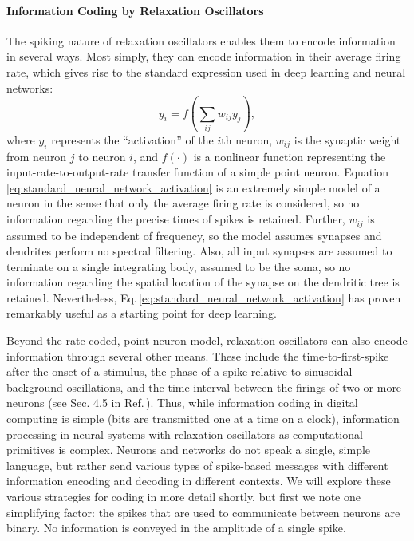 \paragraph{Information Coding by Relaxation Oscillators}
The spiking nature of relaxation oscillators enables them to encode information in several ways. Most simply, they can encode information in their average firing rate, which gives rise to the standard expression used in deep learning and neural networks:
\begin{equation}
\label{eq:standard_neural_network_activation} 
y_i = f(\sum_{ij}w_{ij}y_j),
\end{equation}
where $y_i$ represents the ``activation'' of the $i$th neuron, $w_{ij}$ is the synaptic weight from neuron $j$ to neuron $i$, and $f(\cdot)$ is a nonlinear function representing the input-rate-to-output-rate transfer function of a simple point neuron. Equation \ref{eq:standard_neural_network_activation} is an extremely simple model of a neuron in the sense that only the average firing rate is considered, so no information regarding the precise times of spikes is retained. Further, $w_{ij}$ is assumed to be independent of frequency, so the model assumes synapses and dendrites perform no spectral filtering. Also, all input synapses are assumed to terminate on a single integrating body, assumed to be the soma, so no information regarding the spatial location of the synapse on the dendritic tree is retained. Nevertheless, Eq.\,\ref{eq:standard_neural_network_activation} has proven remarkably useful as a starting point for deep learning. 

Beyond the rate-coded, point neuron model, relaxation oscillators can also encode information through several other means. These include the time-to-first-spike after the onset of a stimulus, the phase of a spike relative to sinusoidal background oscillations, and the time interval between the firings of two or more neurons (see Sec. 4.5 in Ref.\,\cite{geki2002}). Thus, while information coding in digital computing is simple (bits are transmitted one at a time on a clock), information processing in neural systems with relaxation oscillators as computational primitives is complex. Neurons and networks do not speak a single, simple language, but rather send various types of spike-based messages with different information encoding and decoding in different contexts. We will explore these various strategies for coding in more detail shortly, but first we note one simplifying factor: the spikes that are used to communicate between neurons are binary. No information is conveyed in the amplitude of a single spike.

